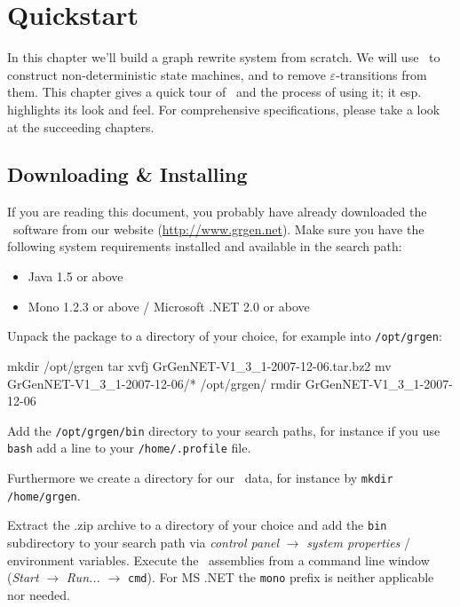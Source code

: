 \chapter{Quickstart}

In this chapter we'll build a graph rewrite system from scratch.
We will use \GrG\ to construct non-deterministic state machines, and to remove $\varepsilon$-transitions from them.
This chapter gives a quick tour of \GrG\ and the process of using it; it esp. highlights its look and feel.
For comprehensive specifications, please take a look at the succeeding chapters.


\section{Downloading \& Installing}

If you are reading this document, you probably have already downloaded the \GrG\ software from our website (\url{http://www.grgen.net}). Make sure you have the following system requirements installed and available in the search path:
\begin{itemize}
	\item Java 1.5 or above
	\item Mono 1.2.3 or above / Microsoft .NET 2.0 or above
\end{itemize}

Unpack the package to a directory of your choice, for example into \texttt{/opt/grgen}:
\begin{bash}
mkdir /opt/grgen
tar xvfj GrGenNET-V1_3_1-2007-12-06.tar.bz2
mv GrGenNET-V1_3_1-2007-12-06/* /opt/grgen/
rmdir GrGenNET-V1_3_1-2007-12-06
\end{bash}
Add the \texttt{/opt/grgen/bin} directory to your search paths, for instance if you use \texttt{bash} add a line to your \texttt{/home/.profile} file.
Furthermore we create a directory for our \GrG\ data, for instance by \texttt{mkdir /home/grgen}.

\vspace{2mm}
Extract the .zip archive to a directory of your choice and add the \texttt{bin} subdirectory to your search path via \emph{control panel} $\rightarrow$ \emph{system properties} / environment variables.
Execute the \GrG\ assemblies from a command line window (\emph{Start} $\rightarrow$ \emph{Run...} $\rightarrow$ \texttt{cmd}).
For MS .NET the \texttt{mono} prefix is neither applicable nor needed.


